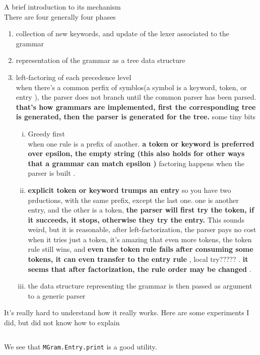 A brief introduction to its mechanism \\
  There are four generally four phases
  \begin{enumerate}[1]
  \item collection of new keywords, and update of the lexer associated
    to the grammar
  \item representation of the grammar as a tree data structure
  \item left-factoring of each precedence level \\
    when there's a common perfix of symblos(a symbol is a keyword,
    token, or entry ), the parser does not branch until the common parser
    has been parsed. \textbf{that's how grammars are implemented, first the
      corresponding tree is generated, then the parser is generated for
      the tree.}
    some tiny bits 
    \begin{enumerate}[(i)]
    \item Greedy first \\
      when one rule is a prefix of another. 
      \textbf{a token or keyword is preferred over
    epsilon, the empty string (this also holds for other ways that a
    grammar can match epsilon )} factoring happens when the parser is
  built .
    \item \textbf{ explicit token or keyword trumps an entry}
      so you have two prductions, with the same prefix, except the last
      one. one is another entry, and the other is a token, \textbf{the parser will
  first try the token, if it succeeds, it stops, otherwise they try
  the entry.} This sounds weird, but it is reasonable, after
left-factorization, the parser pays no cost when it tries just a
token, it's amazing that even more tokens, the token rule still wins,
and \textbf{even the token rule fails after consuming some tokens, it can
  even transfer to the entry rule }, local try????? .
  \textbf{it seems that after factorization, the rule order may be
    changed }. \\
  \item the data structure representing the grammar is then passed as
    argument to a generic parser 
    \end{enumerate}
  \end{enumerate}


It's really hard to understand how it really works. Here are some
experiments I did, but did not know how to explain

\inputminted{ocaml}{camlp4/code/parser1.ml}
We see that \verb|MGram.Entry.print| is a good utility. 


